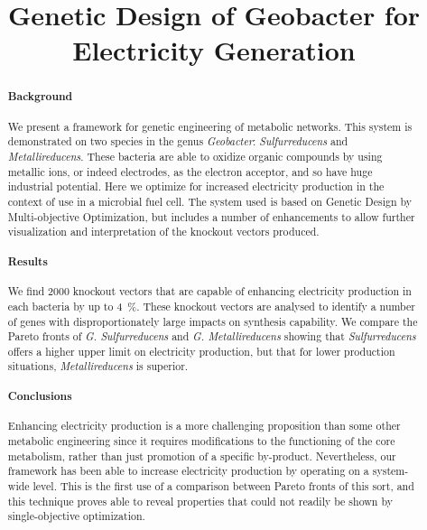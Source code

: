 \documentclass[a4paper,twocolumn]{article}
\begin{document}
\title{Genetic Design of Geobacter for Electricity Generation}
\maketitle
\begin{abstract}
\paragraph{Background}
We present a framework for genetic engineering of metabolic networks. This system is demonstrated on two species in the genus {\it Geobacter}: {\it Sulfurreducens} and {\it Metallireducens}. These bacteria are able to oxidize organic compounds by using metallic ions, or indeed electrodes, as the electron acceptor, and so have huge industrial potential. Here we optimize for increased electricity production in the context of use in a microbial fuel cell. The system used is based on Genetic Design by Multi-objective Optimization, but includes a number of enhancements to allow further visualization and interpretation of the knockout vectors produced.
\paragraph{Results}
We find 2000 knockout vectors that are capable of enhancing electricity production in each bacteria by up to \SI{4}{\percent}. These knockout vectors are analysed to identify a number of genes with disproportionately large impacts on synthesis capability. We compare the Pareto fronts of {\it G. Sulfurreducens} and {\it G. Metallireducens} showing that {\it Sulfurreducens} offers a higher upper limit on electricity production, but that for lower production situations, {\it Metallireducens} is superior.
\paragraph{Conclusions}
Enhancing electricity production is a more challenging proposition than some other metabolic engineering since it requires modifications to the functioning of the core metabolism, rather than just promotion of a specific by-product. Nevertheless, our framework has been able to increase electricity production by operating on a system-wide level. This is the first use of a comparison between Pareto fronts of this sort, and this technique proves able to reveal properties that could not readily be shown by single-objective optimization.

\end{abstract}
\end{document}
